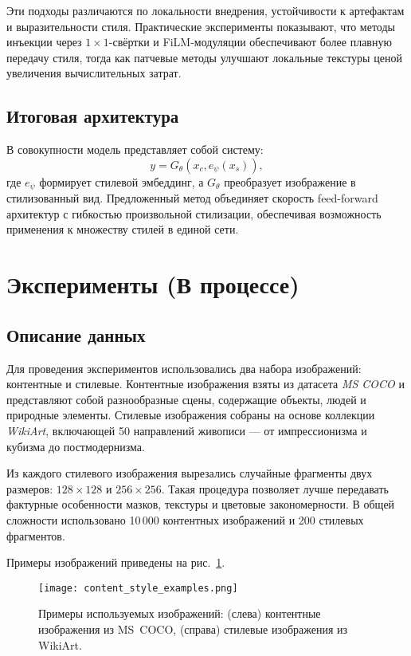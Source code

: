 \documentclass{article}
\begin{document}
Эти подходы различаются по локальности внедрения, устойчивости к артефактам и выразительности стиля.  
Практические эксперименты показывают, что методы инъекции через $1 \times 1$-свёртки и FiLM-модуляции обеспечивают более плавную передачу стиля, тогда как патчевые методы улучшают локальные текстуры ценой увеличения вычислительных затрат.

\subsection*{Итоговая архитектура}

В совокупности модель представляет собой систему:
$$
y = G_\theta(x_c, e_\psi(x_s)),
$$
где $e_\psi$ формирует стилевой эмбеддинг, а $G_\theta$ преобразует изображение в стилизованный вид.  
Предложенный метод объединяет скорость feed-forward архитектур с гибкостью произвольной стилизации, обеспечивая возможность применения к множеству стилей в единой сети.


\section{Эксперименты (В процессе)}

\subsection*{Описание данных}

Для проведения экспериментов использовались два набора изображений: контентные и стилевые.  
Контентные изображения взяты из датасета \textit{MS COCO} и представляют собой разнообразные сцены, содержащие объекты, людей и природные элементы.  
Стилевые изображения собраны на основе коллекции \textit{WikiArt}, включающей 50 направлений живописи — от импрессионизма и кубизма до постмодернизма.  

Из каждого стилевого изображения вырезались случайные фрагменты двух размеров: $128 \times 128$ и $256 \times 256$.  
Такая процедура позволяет лучше передавать фактурные особенности мазков, текстуры и цветовые закономерности.  
В общей сложности использовано 10\,000 контентных изображений и 200 стилевых фрагментов.

Примеры изображений приведены на рис.~\ref{fig:content_style_examples}.

\begin{figure}[H]
    \centering
    \texttt{[image: content\_style\_examples.png]}
    \caption{Примеры используемых изображений: (слева) контентные изображения из MS~COCO, (справа) стилевые изображения из WikiArt.}
    \label{fig:content_style_examples}
\end{figure}
\end{document}
